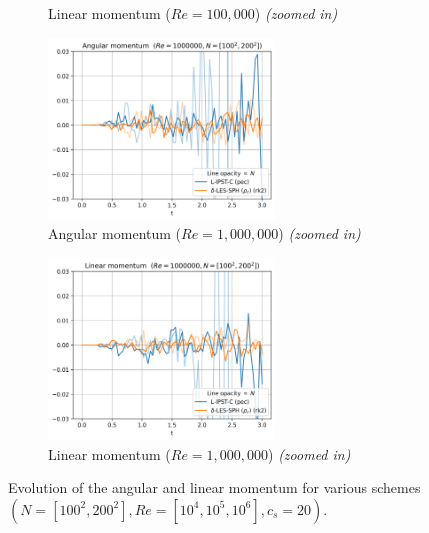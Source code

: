 \begin{figure}[htbp!]
\begin{subfigure}{7cm}
  \caption{Linear momentum ($Re = 100,000$) \textit{(zoomed in)}}
  \end{subfigure}
  \begin{subfigure}{7cm}
    \centering\includegraphics[width=6cm]{Code-Figures/ext-force-tgv/limit_am_re_1000000.png}
    \caption{Angular momentum ($Re = 1,000,000$) \textit{(zoomed in)}}
  \end{subfigure}
  \begin{subfigure}{7cm}
    \centering\includegraphics[width=6cm]{Code-Figures/ext-force-tgv/limit_lm_re_1000000.png}
    \caption{Linear momentum ($Re = 1,000,000$) \textit{(zoomed in)}}
  \end{subfigure}
  \caption{Evolution of the angular and linear momentum for various schemes $(N=[100^2, 200^2], Re=[10^4, 10^5, 10^6], c_s=20)$.}
  \label{fig:tgv-forced-am-lm}
\end{figure}

